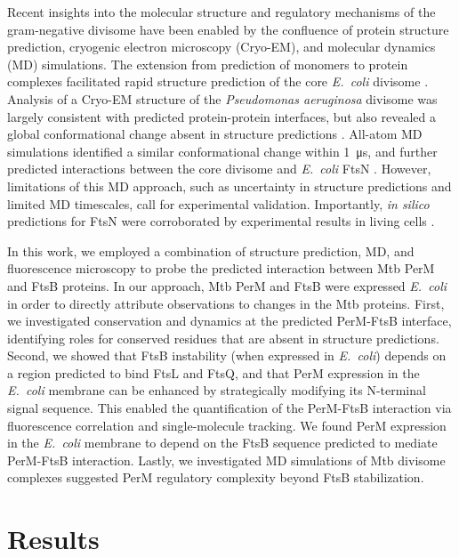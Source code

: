 \documentclass[pdflatex,sn-nature]{sn-jnl}%
\newcommand\ec{\textit{E.~coli}}
\newcommand\mtb{Mtb}
\newcommand\pafull{\textit{Pseudomonas aeruginosa}}
\begin{document}
Recent insights into the molecular structure and regulatory mechanisms of the gram-negative divisome have been enabled by the confluence of protein structure prediction, cryogenic electron microscopy (Cryo-EM), and molecular dynamics (MD) simulations.
The extension from prediction of monomers to protein complexes \citep{baekAccuratePredictionProtein2021, evansProteinComplexPrediction2022} facilitated rapid structure prediction of the core \ec{} divisome \citep{attaibiUpdatedModelDivisome2022, cravenModelInteractionsFtsQLB2022}.
Analysis of a Cryo-EM structure of the \pafull{} divisome was largely consistent with predicted protein-protein interfaces, but also revealed a global conformational change absent in structure predictions \citep{kashammerCryoEMStructureBacterial2023}.
All-atom MD simulations identified a similar conformational change within \qty{1}{\us}, and further predicted interactions between the core divisome and \ec{} FtsN \citep{brittonConformationalChangesEssential2023}.
However, limitations of this MD approach, such as uncertainty in structure predictions and limited MD timescales, call for experimental validation. Importantly, \textit{in silico} predictions for FtsN were corroborated by experimental results in living cells \citep{parkEssentialDomainFtsN2023}.

In this work, we employed a combination of structure prediction, MD, and fluorescence microscopy to probe the predicted interaction between \mtb{} PerM and FtsB proteins.
In our approach, \mtb{} PerM and FtsB were expressed \ec{} in order to directly attribute observations to changes in the \mtb{} proteins.
First, we investigated conservation and dynamics at the predicted PerM-FtsB interface, identifying roles for conserved residues that are absent in structure predictions.
Second, we showed that FtsB instability (when expressed in \ec{}) depends on a region predicted to bind FtsL and FtsQ, and that PerM expression in the \ec{} membrane can be enhanced by strategically modifying its N-terminal signal sequence.
This enabled the quantification of the PerM-FtsB interaction via fluorescence correlation and single-molecule tracking.
We found PerM expression in the \ec{} membrane to depend on the FtsB sequence predicted to mediate PerM-FtsB interaction.
Lastly, we investigated MD simulations of \mtb{} divisome complexes suggested PerM regulatory complexity beyond FtsB stabilization.

\section{Results}
\end{document}
